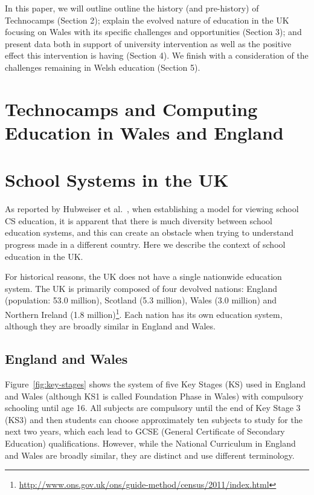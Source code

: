 \documentclass{sig-alternate}
\begin{document}
In this paper, we will outline 
outline the history (and pre-history) of Technocamps
(Section 2);
explain the evolved nature of education
in the UK focusing on Wales with its specific
challenges and opportunities (Section 3);
and present data both in support of
university intervention as well as
the positive effect this intervention is having (Section 4).
We finish with a consideration of the challenges remaining
in Welsh education (Section 5).

\section{Technocamps and Computing Education in Wales and England}

\section{School Systems in the UK}\label{sec:schools}

As reported by Hubweiser et al.~\cite{hubwieser-et-al:2011}, when establishing a
model for viewing school CS education, it is apparent that there is
much diversity between school education systems, and this can create
an obstacle when trying to understand progress made in a different
country. Here we describe the context of school education in the UK.

For historical reasons, the UK does not have a single nationwide
education system.  The UK is primarily composed of four devolved
nations: England (population: 53.0 million), Scotland (5.3 million),
Wales (3.0 million) and Northern Ireland (1.8
million)\footnote{\url{http://www.ons.gov.uk/ons/guide-method/census/2011/index.html}}.
Each nation has its own education system, although they are broadly
similar in England and Wales.

\subsection{England and Wales}
Figure~\ref{fig:key-stages} shows the system of five Key Stages (KS)
used in England and Wales (although KS1 is called Foundation Phase in
Wales) with compulsory schooling until age 16. All subjects are
compulsory until the end of Key Stage 3 (KS3) and then students can
choose approximately ten subjects to study for the next two years,
which each lead to GCSE (General Certificate of Secondary Education)
qualifications. However, while the National Curriculum in England and
Wales are broadly similar, they are distinct and use different
terminology.
\end{document}
